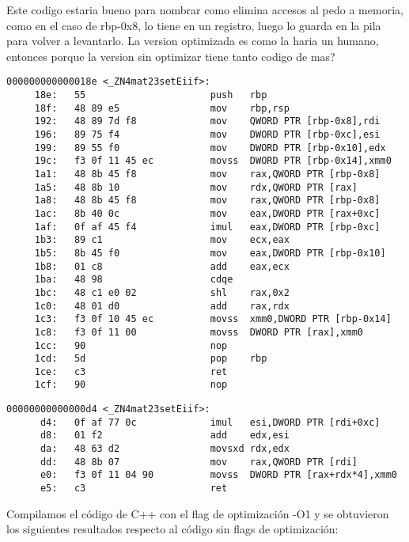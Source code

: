 \colorbox{BurntOrange}{Este codigo estaria bueno para nombrar como elimina accesos al pedo a memoria, como en el caso de rbp-0x8, lo tiene en un registro, luego lo guarda en la pila para volver a levantarlo. La version optimizada es como la haria un humano, entonces porque la version sin optimizar tiene tanto codigo de mas?}

\begin{verbatim}
000000000000018e <_ZN4mat23setEiif>:
     18e:	55                   	push   rbp
     18f:	48 89 e5             	mov    rbp,rsp
     192:	48 89 7d f8          	mov    QWORD PTR [rbp-0x8],rdi
     196:	89 75 f4             	mov    DWORD PTR [rbp-0xc],esi
     199:	89 55 f0             	mov    DWORD PTR [rbp-0x10],edx
     19c:	f3 0f 11 45 ec       	movss  DWORD PTR [rbp-0x14],xmm0
     1a1:	48 8b 45 f8          	mov    rax,QWORD PTR [rbp-0x8]
     1a5:	48 8b 10             	mov    rdx,QWORD PTR [rax]
     1a8:	48 8b 45 f8          	mov    rax,QWORD PTR [rbp-0x8]
     1ac:	8b 40 0c             	mov    eax,DWORD PTR [rax+0xc]
     1af:	0f af 45 f4          	imul   eax,DWORD PTR [rbp-0xc]
     1b3:	89 c1                	mov    ecx,eax
     1b5:	8b 45 f0             	mov    eax,DWORD PTR [rbp-0x10]
     1b8:	01 c8                	add    eax,ecx
     1ba:	48 98                	cdqe   
     1bc:	48 c1 e0 02          	shl    rax,0x2
     1c0:	48 01 d0             	add    rax,rdx
     1c3:	f3 0f 10 45 ec       	movss  xmm0,DWORD PTR [rbp-0x14]
     1c8:	f3 0f 11 00          	movss  DWORD PTR [rax],xmm0
     1cc:	90                   	nop
     1cd:	5d                   	pop    rbp
     1ce:	c3                   	ret    
     1cf:	90                   	nop
\end{verbatim}

\begin{verbatim}
00000000000000d4 <_ZN4mat23setEiif>:
      d4:	0f af 77 0c          	imul   esi,DWORD PTR [rdi+0xc]
      d8:	01 f2                	add    edx,esi
      da:	48 63 d2             	movsxd rdx,edx
      dd:	48 8b 07             	mov    rax,QWORD PTR [rdi]
      e0:	f3 0f 11 04 90       	movss  DWORD PTR [rax+rdx*4],xmm0
      e5:	c3                   	ret  
\end{verbatim}




Compilamos el código de C++ con el flag de optimización -O1 y se obtuvieron los siguientes resultados respecto al código sin flags de optimización:\\

